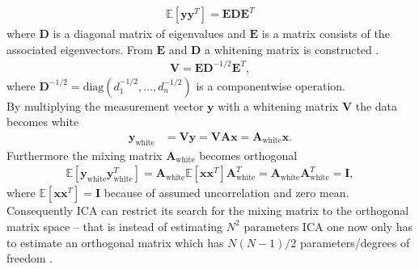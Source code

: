 \begin{align*}
\mathbb{E}[\mathbf{yy}^T] = \mathbf{EDE}^T
\end{align*}
where $\mathbf{D}$ is a diagonal matrix of eigenvalues and $\mathbf{E}$ is a matrix consists of the associated eigenvectors. 
From $\mathbf{E}$ and $\mathbf{D}$ a whitening matrix is constructed \cite[p.159]{ICA}.
\begin{align*}
\mathbf{V} = \mathbf{ED}^{-1/2} \mathbf{E}^T,
\end{align*}
where $\mathbf{D}^{-1/2} = \text{diag}(d_1^{-1/2},\dots, d_n^{-1/2})$ is a componentwise operation.
\\  
By multiplying the measurement vector $\mathbf{y}$ with a whitening matrix $\mathbf{V}$ the data becomes white
\begin{align}
\mathbf{y}_{\text{white}} &= \mathbf{Vy} = \mathbf{VAx} = \mathbf{A}_{\text{white}} \mathbf{x}. \nonumber
\end{align}
Furthermore the mixing matrix $\mathbf{A}_{\text{white}}$ becomes orthogonal 
\begin{align*}
 \mathbb{E}[\mathbf{y}_{\text{white}} \mathbf{y}_{\text{white}}^T] = \mathbf{A}_{\text{white}} \mathbb{E}[\mathbf{xx}^T] \mathbf{A}_{\text{white}}^T = \mathbf{A}_{\text{white}} \mathbf{A}_{\text{white}}^T = \mathbf{I},
 \end{align*} 
where $\mathbb{E}[\mathbf{xx}^T] = \mathbf{I}$ because of assumed uncorrelation and zero mean. Consequently ICA can restrict its search for the mixing matrix to the orthogonal matrix space -- that is instead of estimating $N^2$ parameters ICA one now only has to estimate an orthogonal matrix which has $N(N-1)/2$ parameters/degrees of freedom \cite[p. 159]{ICA}.


